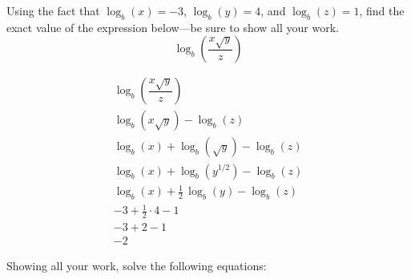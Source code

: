 \documentclass[12pt,letterpaper]{exam}
\begin{document}
\begin{questions}
\question[8] Using the fact that $\log_b(x)= -3$, $\log_b(y)= 4$, and $\log_b(z)= 1$, find the exact value of the expression below---be sure to show all your work.
	\[
	\log_b \left( \dfrac{x \sqrt{y}}{z} \right)
	\] \pvspace{0.5cm}
	
	\[
	\begin{gathered}
	\log_b \left( \dfrac{x \sqrt{y}}{z} \right) \\[0.3cm]
	\log_b \left( x \sqrt{y} \right) - \log_b(z) \\[0.3cm]
	\log_b (x) + \log_b (\sqrt{y}) - \log_b(z) \\[0.3cm]
	\log_b (x) + \log_b (y^{1/2}) - \log_b(z) \\[0.3cm]
	\log_b (x) + \frac{1}{2}\, \log_b (y) - \log_b(z) \\[0.3cm]
	-3 + \frac{1}{2} \cdot 4 - 1 \\[0.3cm]
	-3 + 2 - 1 \\[0.3cm]
	-2
	\end{gathered}
	\]



\newpage
\question[10] Showing all your work, solve the following equations: \par\vspace{0.5cm}
\end{questions}
\end{document}
